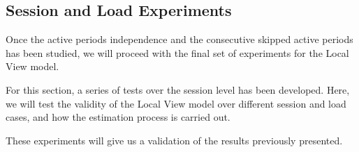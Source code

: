 \subsection{Session and Load Experiments} \label{subsec:localview_session}
Once the active periods independence and the consecutive skipped active periods has been studied, we will proceed with the final set of experiments for the Local View model.

For this section, a series of tests over the session level has been developed. Here, we will test the validity of the Local View model over different session and load cases, and how the estimation process is carried out.

These experiments will give us a validation of the results previously presented.